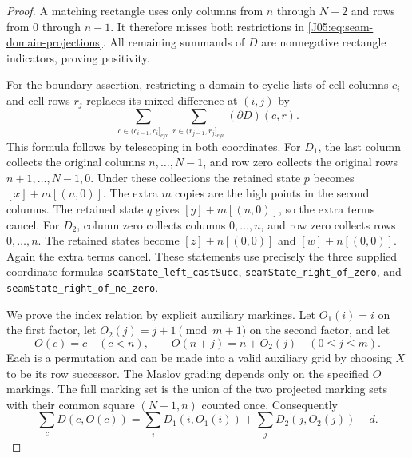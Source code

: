\documentclass[11pt,oneside]{report}
\theoremstyle{definition}
\numberwithin{equation}{section}
\newcommand{\decl}[1]{\textnormal{\nolinkurl{#1}}}
\begin{document}
\begin{proof}
A matching rectangle uses only columns from $n$ through $N-2$ and
rows from $0$ through $n-1$. It therefore misses both restrictions in
\eqref{J05:eq:seam-domain-projections}. All remaining summands of $D$ are
nonnegative rectangle indicators, proving positivity.

For the boundary assertion, restricting a domain to cyclic lists of
cell columns $c_i$ and cell rows $r_j$ replaces its mixed difference
at $(i,j)$ by
\[
 \sum_{c\in(c_{i-1},c_i]_{\mathrm{cyc}}}
 \sum_{r\in(r_{j-1},r_j]_{\mathrm{cyc}}}(\partial D)(c,r).
\]
This formula follows by telescoping in both coordinates.
For $D_1$, the last column collects the original columns
$n,\ldots,N-1$, and row zero collects the original rows
$n+1,\ldots,N-1,0$. Under these collections the retained state $p$
becomes $[x]+m[(n,0)]$. The extra $m$ copies are the high points in
the second columns. The retained state $q$ gives
$[y]+m[(n,0)]$, so the extra terms cancel.
For $D_2$, column zero collects columns $0,\ldots,n$, and row zero
collects rows $0,\ldots,n$. The retained states become
$[z]+n[(0,0)]$ and $[w]+n[(0,0)]$. Again the extra terms cancel.
These statements use precisely the three supplied coordinate formulas
\decl{seamState_left_castSucc}, \decl{seamState_right_of_zero}, and
\decl{seamState_right_of_ne_zero}.

We prove the index relation by explicit auxiliary markings.
Let $O_1(i)=i$ on the first factor, let
$O_2(j)=j+1\pmod{m+1}$ on the second factor, and let
\[
 O(c)=c\quad(c<n),\qquad
 O(n+j)=n+O_2(j)\quad(0\le j\le m).
\]
Each is a permutation and can be made into a valid auxiliary grid by
choosing $X$ to be its row successor. The Maslov grading depends only on
the specified $O$ markings. The full marking set is the union of the
two projected marking sets with their common square $(N-1,n)$ counted
once. Consequently
\begin{equation}\label{J05:eq:seam-marking-domain-count}
 \sum_c D(c,O(c))=
 \sum_iD_1(i,O_1(i))+\sum_jD_2(j,O_2(j))-d.
\end{equation}


\end{proof}
\end{document}
